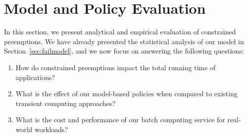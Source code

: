 \vspace*{\subsecspace}
\section{Model and Policy Evaluation}
\label{sec:eval}

%


In this section, we present analytical and empirical evaluation of constrained preemptions.
We have already presented the statistical analysis of our model in Section~\ref{sec:failmodel}, and we now focus on answering the following questions: 

\begin{enumerate}
\item How do constrained preemptions impact the total running time of applications?

\item  What is the effect of our model-based policies when compared to existing transient computing approaches?


\item What is the cost and performance of our batch computing service for real-world workloads? 
  
\end{enumerate}


